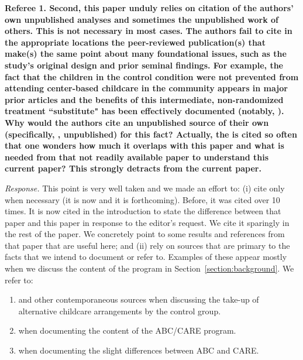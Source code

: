 \noindent \textbf{Referee 1. Second, this paper unduly relies on citation of the authors' own unpublished analyses and sometimes the unpublished work of others. This is not necessary in most cases. The authors fail to cite in the appropriate locations the peer-reviewed publication(s) that make(s) the same point about many foundational issues, such as the study's original design and prior seminal findings. For example, the fact that the children in the control condition were not prevented from attending center-based childcare in the community appears in major prior articles and the benefits of this intermediate, non-randomized treatment ``substitute" has been effectively documented (notably, \citet{Burchinal_etal_1989_CD_Daycare-Pre-K-Dev}). Why would the authors cite an unpublished source of their own (specifically, \citet{Garcia_Heckman_Ziff_2017_Gender-Diff_UNPUBLISHED}, unpublished) for this fact? Actually, the \citet{Garcia_Heckman_Ziff_2017_Gender-Diff_UNPUBLISHED} is cited so often that one wonders how much it overlaps with this paper and what is needed from that not readily available paper to understand this current paper? This strongly detracts from the current paper.}

\noindent \textit{Response.} This point is very well taken and we made an effort to: (i) cite \citet{Garcia_Heckman_Ziff_2017_Gender-Diff_UNPUBLISHED} only when necessary (it is now \citet{Garcia_Heckman_Ziff_2018_EER} and it is forthcoming). Before, it was cited over 10 times. It is now cited in the introduction to state the difference between that paper and this paper in response to the editor's request. We cite it sparingly in the rest of the paper. We concretely point to some results and references from that paper that are useful here; and (ii) rely on sources that are primary to the facts that we intend to document or refer to. Examples of these appear mostly when we discuss the content of the program in Section~\ref{section:background}. We refer to:

\begin{enumerate}
\item \citet{Burchinal_etal_1989_CD_Daycare-Pre-K-Dev} and other contemporaneous sources when discussing the take-up of alternative childcare arrangements by the control group.
\item \citet{Sparling_1974_Synth_Edu_Infant_SPEECH, Ramey_Collier_etal_1976_CarolinaAbecedarianProject, Ramey_etal_1985_Project-CARE_TiECSE, Wasik_Ramey_etal_1990_CD, Ramey-etal_2012-ABC} when documenting the content of the ABC/CARE program.
\item \citet{Wasik_Ramey_etal_1990_CD} when documenting the slight differences between ABC and CARE.
\end{enumerate}

